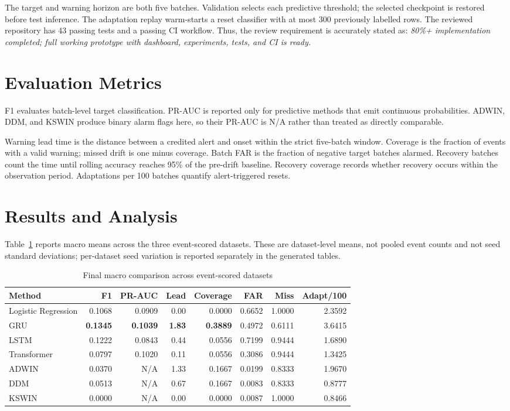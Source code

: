 \documentclass[10pt,twocolumn]{article}
\begin{document}
The target and warning horizon are both five batches. Validation selects each predictive threshold; the selected checkpoint is restored before test inference. The adaptation replay warm-starts a reset classifier with at most 300 previously labelled rows. The reviewed repository has 43 passing tests and a passing CI workflow. Thus, the review requirement is accurately stated as: \emph{80\%+ implementation completed; full working prototype with dashboard, experiments, tests, and CI is ready.}

\section{Evaluation Metrics}
F1 evaluates batch-level target classification. PR-AUC is reported only for predictive methods that emit continuous probabilities. ADWIN, DDM, and KSWIN produce binary alarm flags here, so their PR-AUC is N/A rather than treated as directly comparable.

Warning lead time is the distance between a credited alert and onset within the strict five-batch window. Coverage is the fraction of events with a valid warning; missed drift is one minus coverage. Batch FAR is the fraction of negative target batches alarmed. Recovery batches count the time until rolling accuracy reaches 95\% of the pre-drift baseline. Recovery coverage records whether recovery occurs within the observation period. Adaptations per 100 batches quantify alert-triggered resets.

\section{Results and Analysis}
Table~\ref{tab:results} reports macro means across the three event-scored datasets. These are dataset-level means, not pooled event counts and not seed standard deviations; per-dataset seed variation is reported separately in the generated tables.

\begin{table}[t]
\caption{Final macro comparison across event-scored datasets}
\centering\small
\begin{tabular}{lrrrrrrr}
\toprule
Method & F1 & PR-AUC & Lead & Coverage & FAR & Miss & Adapt/100 \\
\midrule
Logistic Regression & 0.1068 & 0.0909 & 0.00 & 0.0000 & 0.6652 & 1.0000 & 2.3592 \\
GRU & \textbf{0.1345} & \textbf{0.1039} & \textbf{1.83} & \textbf{0.3889} & 0.4972 & 0.6111 & 3.6415 \\
LSTM & 0.1222 & 0.0843 & 0.44 & 0.0556 & 0.7199 & 0.9444 & 1.6890 \\
Transformer & 0.0797 & 0.1020 & 0.11 & 0.0556 & 0.3086 & 0.9444 & 1.3425 \\
ADWIN & 0.0370 & N/A & 1.33 & 0.1667 & 0.0199 & 0.8333 & 1.9670 \\
DDM & 0.0513 & N/A & 0.67 & 0.1667 & 0.0083 & 0.8333 & 0.8777 \\
KSWIN & 0.0000 & N/A & 0.00 & 0.0000 & 0.0087 & 1.0000 & 0.8466 \\
\bottomrule
\end{tabular}
\label{tab:results}
\end{table}
\end{document}
